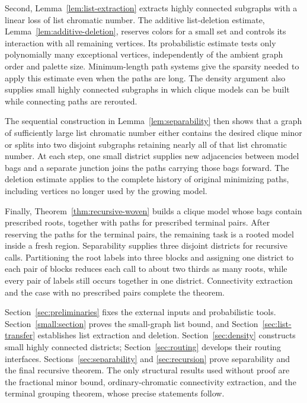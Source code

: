 Second, Lemma~\ref{lem:list-extraction} extracts highly connected
subgraphs with a linear loss of list chromatic number. The additive
list-deletion estimate, Lemma~\ref{lem:additive-deletion}, reserves
colors for a small set and controls its interaction with all remaining
vertices. Its probabilistic estimate tests only polynomially many
exceptional vertices, independently of the ambient graph order and
palette size. Minimum-length path systems give the sparsity needed to
apply this estimate even when the paths are long. The density argument
also supplies small highly connected subgraphs in which clique models
can be built while connecting paths are rerouted.

The sequential construction in Lemma~\ref{lem:separability} then shows
that a graph of sufficiently large list chromatic number either contains
the desired clique minor or splits into two disjoint subgraphs retaining
nearly all of that list chromatic number. At each step, one small district
supplies new adjacencies between model bags and a separate junction joins
the paths carrying those bags forward. The deletion estimate applies to
the complete history of original minimizing paths, including vertices
no longer used by the growing model.

Finally, Theorem~\ref{thm:recursive-woven} builds a clique model whose
bags contain prescribed roots, together with paths for prescribed
terminal pairs. After reserving the paths for the terminal pairs, the
remaining task is a rooted model inside a fresh region. Separability
supplies three disjoint districts for recursive calls. Partitioning the
root labels into three blocks and assigning one district to each pair
of blocks reduces each call to about two thirds as many roots, while
every pair of labels still occurs together in one district. Connectivity
extraction and the case with no prescribed pairs complete the theorem.

Section~\ref{sec:preliminaries} fixes the external inputs and
probabilistic tools. Section~\ref{small:section} proves the small-graph
list bound, and Section~\ref{sec:list-transfer} establishes list
extraction and deletion. Section~\ref{sec:density} constructs small
highly connected districts; Section~\ref{sec:routing} develops their
routing interfaces. Sections~\ref{sec:separability} and
\ref{sec:recursion} prove separability and the final recursive theorem.
The only structural results used without proof are the fractional minor
bound, ordinary-chromatic connectivity extraction, and the terminal
grouping theorem, whose precise statements follow.
